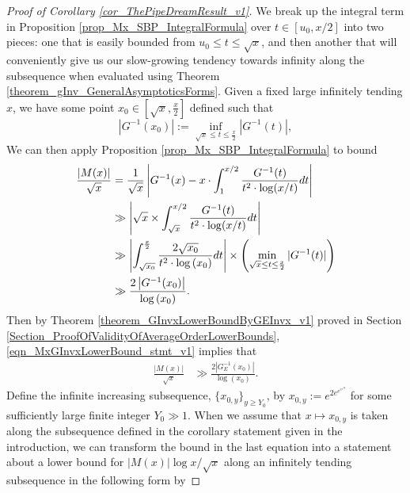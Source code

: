 \documentclass[11pt,reqno,a4letter]{article}
\numberwithin{figure}{section}
\numberwithin{table}{section}
\theoremstyle{plain}
\numberwithin{theorem}{section}
\theoremstyle{definition}
\begin{document}
\begin{proof}[Proof of Corollary \ref{cor_ThePipeDreamResult_v1}] 
\label{proofOf_cor_ThePipeDreamResult_v1} 
We break up the integral term in 
Proposition \ref{prop_Mx_SBP_IntegralFormula} 
over $t \in [u_0, x/2]$ into two pieces: one that is easily bounded 
from $u_0 \leq t \leq \sqrt{x}$, 
and then another that will conveniently give us our slow-growing tendency towards 
infinity along the subsequence when evaluated using 
Theorem \ref{theorem_gInv_GeneralAsymptoticsForms}. 
Given a fixed large infinitely tending $x$, we have some point 
$x_0 \in \left[\sqrt{x}, \frac{x}{2}\right]$ defined such that 
\[
\left\lvert G^{-1}(x_0) \right\rvert := 
     \inf_{\sqrt{x} \leq t \leq \frac{x}{2}} |G^{-1}(t)|, 
\]
We can then apply Proposition \ref{prop_Mx_SBP_IntegralFormula} to bound 
\begin{align} 
\notag 
\frac{|M(x)|}{\sqrt{x}} & = 
     \frac{1}{\sqrt{x}} \left\lvert G^{-1}(x) - x \cdot \int_1^{x/2} \frac{G^{-1}(t)}{ 
     t^2 \cdot \log(x/t)} dt \right\rvert \\ 
\notag 
     & \gg 
     \left\lvert \sqrt{x} \times \int_{\sqrt{x}}^{x/2} \frac{G^{-1}(t)}{ 
     t^2 \cdot \log(x/t)} dt \right\rvert \\ 
\notag 
     & \gg \left\lvert \int_{\sqrt{x_0}}^{\frac{x}{2}} \frac{2 \sqrt{x_0}}{ 
     t^2 \cdot \log\left(x_0\right)} dt \right\rvert 
     \times \left( 
     \min_{\sqrt{x} \leq t \leq \frac{x}{2}} |G^{-1}(t)| 
     \right) \\ 
\label{eqn_MxGInvxLowerBound_stmt_v1} 
     & \gg  
     \frac{2 \left\lvert G^{-1}(x_0) \right\rvert}{\log\left(x_0\right)}. 
\end{align} 
Then by Theorem \ref{theorem_GInvxLowerBoundByGEInvx_v1} proved in 
Section \ref{Section_ProofOfValidityOfAverageOrderLowerBounds}, 
\eqref{eqn_MxGInvxLowerBound_stmt_v1} implies that 
\begin{align} 
\label{eqn_MxGInvxLowerBound_stmt_v2} 
\frac{|M(x)|}{\sqrt{x}} & \gg \frac{2 \left\lvert G_{E}^{-1}(x_0) \right\rvert}{\log\left(x_0\right)}. 
\end{align} 
Define the infinite increasing subsequence, 
$\{x_{0,y}\}_{y \geq Y_0}$, by $x_{0,y} := e^{2e^{e^{e^{e^{2y}}}}}$ for some sufficiently 
large finite integer $Y_0 \gg 1$. 
When we assume that $x \mapsto x_{0,y}$ is taken along the 
subsequence defined in the corollary statement given in the introduction, 
we can transform the bound in the last 
equation into a statement about a lower bound for $|M(x)| \log x / \sqrt{x}$ 
along an infinitely tending subsequence in the following form by 

\end{proof}
\end{document}
